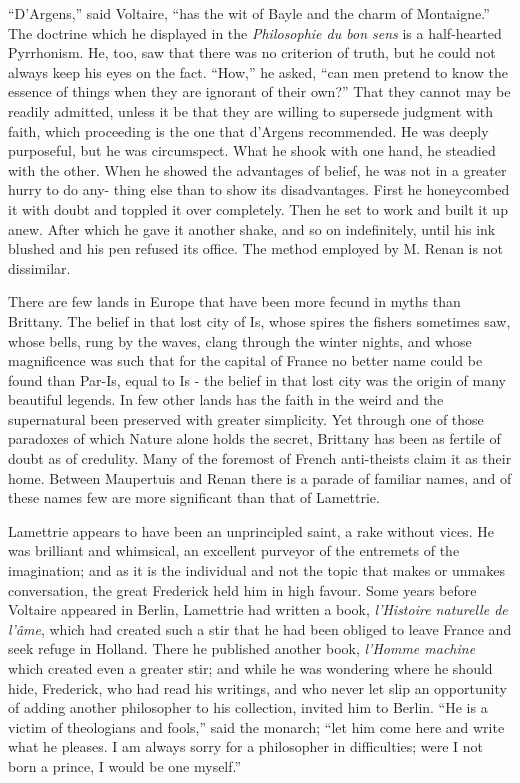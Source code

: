 \documentclass[]{book}
\begin{document}
``D'Argens,'' said Voltaire, ``has the wit of Bayle and the charm of
Montaigne.'' The doctrine which he displayed in the \emph{Philosophie du
bon sens} is a half-hearted Pyrrhonism. He, too, saw that there was no
criterion of truth, but he could not always keep his eyes on the fact.
``How,'' he asked, ``can men pretend to know the essence of things when
they are ignorant of their own?'' That they cannot may be readily
admitted, unless it be that they are willing to supersede judgment with
faith, which proceeding is the one that d'Argens recommended. He was
deeply purposeful, but he was circumspect. What he shook with one hand,
he steadied with the other. When he showed the advantages of belief, he
was not in a greater hurry to do any- thing else than to show its
disadvantages. First he honeycombed it with doubt and toppled it over
completely. Then he set to work and built it up anew. After which he
gave it another shake, and so on indefinitely, until his ink blushed and
his pen refused its office. The method employed by M. Renan is not
dissimilar.

There are few lands in Europe that have been more fecund in myths than
Brittany. The belief in that lost city of Is, whose spires the fishers
sometimes saw, whose bells, rung by the waves, clang through the winter
nights, and whose magnificence was such that for the capital of France
no better name could be found than Par-Is, equal to Is - the belief in
that lost city was the origin of many beautiful legends. In few other
lands has the faith in the weird and the supernatural been preserved
with greater simplicity. Yet through one of those paradoxes of which
Nature alone holds the secret, Brittany has been as fertile of doubt as
of credulity. Many of the foremost of French anti-theists claim it as
their home. Between Maupertuis and Renan there is a parade of familiar
names, and of these names few are more significant than that of
Lamettrie.

Lamettrie appears to have been an unprincipled saint, a rake without
vices. He was brilliant and whimsical, an excellent purveyor of the
entremets of the imagination; and as it is the individual and not the
topic that makes or unmakes conversation, the great Frederick held him
in high favour. Some years before Voltaire appeared in Berlin, Lamettrie
had written a book, \emph{l'Histoire naturelle de l'âme}, which had
created such a stir that he had been obliged to leave France and seek
refuge in Holland. There he published another book, \emph{l'Homme
machine} which created even a greater stir; and while he was wondering
where he should hide, Frederick, who had read his writings, and who
never let slip an opportunity of adding another philosopher to his
collection, invited him to Berlin. ``He is a victim of theologians and
fools,'' said the monarch; ``let him come here and write what he
pleases. I am always sorry for a philosopher in difficulties; were I not
born a prince, I would be one myself.''
\end{document}
